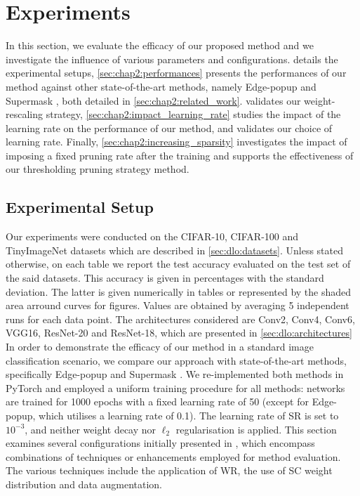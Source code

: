 \section{Experiments}
\label{sec:chap2:experiments}

In this section, we  evaluate the efficacy of our proposed method and we
investigate the influence of various parameters and configurations.
 details the experimental setups,
\cref{sec:chap2:performances} presents the performances of our method against
other state-of-the-art methods, namely Edge-popup
\cite{DBLP:conf/cvpr/RamanujanWKFR20} and Supermask
\cite{DBLP:conf/nips/ZhouLLY19}, both detailed in \cref{sec:chap2:related_work}.
 validates our weight-rescaling
strategy,  \cref{sec:chap2:impact_learning_rate} studies the impact of the
learning rate on the performance of our method, and validates our choice of
learning rate. Finally, \cref{sec:chap2:increasing_sparsity} investigates the
impact of imposing a fixed pruning rate after the training and supports the
effectiveness of our thresholding pruning strategy method.


\subsection{Experimental Setup}
\label{sec:chap2:experimental_setup}

Our experiments were conducted on the CIFAR-10, CIFAR-100 and TinyImageNet
datasets which are described in \cref{sec:dlo:datasets}. Unless stated
otherwise, on each table we report the test accuracy evaluated on the test set
of the said datasets. This accuracy is given in percentages with the standard
deviation. The latter is given numerically in tables or represented by the
shaded area arround curves for figures. Values are obtained by averaging 5
independent runs for each data point. The architectures considered are Conv2,
Conv4, Conv6, VGG16, ResNet-20 and ResNet-18, which are presented in
\cref{sec:dlo:architectures}\\

In order to demonstrate the efficacy of our method in a standard image
classification scenario, we compare our approach with state-of-the-art methods,
specifically Edge-popup \cite{DBLP:conf/cvpr/RamanujanWKFR20} and Supermask
\cite{DBLP:conf/nips/ZhouLLY19}. We re-implemented both methods in PyTorch
\cite{DBLP:conf/nips/PaszkeGMLBCKLGA19} and employed a uniform training
procedure for all methods: networks are trained for 1000 epochs with a fixed
learning rate of 50 (except for Edge-popup, which utilises a learning rate of
0.1). The learning rate of \ac{SR} is set to $10^{-3}$, and  neither weight
decay nor $\ell_2$ regularisation is applied. This section examines several
configurations initially presented in \cite{DBLP:conf/nips/ZhouLLY19}, which
encompass combinations of techniques or enhancements employed for method
evaluation. The various techniques include the application of \ac{WR}, the use
of \ac{SC} weight distribution
\cite{DBLP:conf/nips/ZhouLLY19,DBLP:conf/cvpr/RamanujanWKFR20} and data
augmentation.\\

